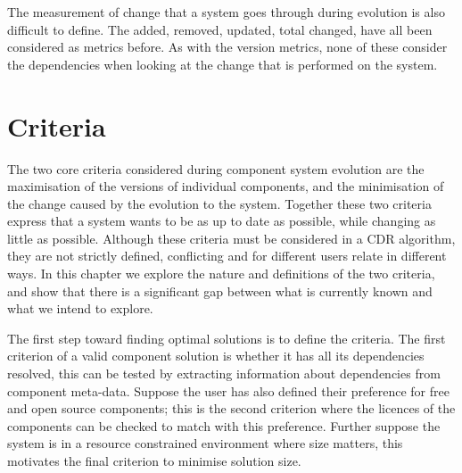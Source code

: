 The measurement of change that a system goes through during evolution is also difficult to define.
The added, removed, updated, total changed, have all been considered as metrics before. 
As with the version metrics, none of these consider the dependencies when looking at the change that is performed on the system.






\section{Criteria}
The two core criteria considered during component system evolution are the maximisation of the versions of individual components, 
and the minimisation of the change caused by the evolution to the system.
Together these two criteria express that a system wants to be as up to date as possible, while changing as little as possible.
Although these criteria must be considered in a CDR algorithm,
they are not strictly defined, conflicting and for different users relate in different ways.
In this chapter we explore the nature and definitions of the two criteria,
and show that there is a significant gap between what is currently known and what we intend to explore. 

The first step toward finding optimal solutions is to define the criteria.
The first criterion of a valid component solution is whether it has all its dependencies resolved,
this can be tested by extracting information about dependencies from component meta-data.
Suppose the user has also defined their preference for free and open source components;
this is the second criterion where the licences of the components can be checked to match with this preference.
Further suppose the system is in a resource constrained environment where size matters, 
this motivates the final criterion to minimise solution size.

